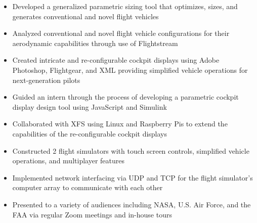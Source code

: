 \documentclass[10pt,a4paper,ragged2e,withhyper]{altacv}
\begin{document}
\begin{paracol}{2}
  \begin{itemize}
    \item Developed a generalized parametric sizing tool that optimizes, sizes, and generates conventional and novel flight vehicles
    \item Analyzed conventional and novel flight vehicle configurations for their aerodynamic capabilities through use of Flightstream
    \item Created intricate and re-configurable cockpit displays using Adobe Photoshop, Flightgear, and XML providing simplified vehicle operations for next-generation
          pilots
    \item Guided an intern through the process of developing a parametric cockpit display design tool using JavaScript and Simulink
    \item Collaborated with XFS using Linux and Raspberry Pis to extend the capabilities of the re-configurable cockpit displays
    \item Constructed 2 flight simulators with touch screen controls, simplified vehicle operations, and multiplayer features
    \item Implemented network interfacing via UDP and TCP for the flight simulator's computer array to communicate with each other
    \item Presented to a variety of audiences including NASA, U.S. Air Force, and the FAA via regular Zoom meetings and in-house tours
  \end{itemize}
  \divider


\end{paracol}
\end{document}
